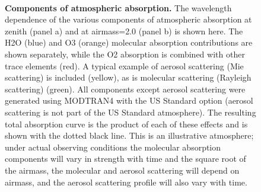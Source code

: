 \documentclass[12pt,preprint]{aastex}
\begin{document}
\begin{figure}
\centering
{}\\
\vspace{-15pt}
\caption{{\small
{\bf Components of atmospheric absorption.} The wavelength dependence
of the various components of atmospheric absorption at zenith (panel
a) and at airmass=2.0 (panel b) is shown here.  The H2O (blue) and O3
(orange) molecular absorption contributions are shown separately,
while the O2 absorption is combined with other trace elements (red). A
typical example of aerosol scattering (Mie scattering) is included
(yellow), as is molecular scattering (Rayleigh scattering)
(green). All components except aerosol scattering were generated using
MODTRAN4 with the US Standard option (aerosol scattering is not part of the US 
Standard atmosphere). The resulting total absorption curve is the product of each
of these effects and is shown with the dotted black line. This is an
illustrative atmosphere; under actual observing conditions the
molecular absorption components will vary in strength with time and
the square root of the airmass, the molecular and aerosol scattering
will depend on airmass, and the aerosol scattering profile will also 
vary with time.}}
\label{fig:absorption_comps}
\end{figure}
\end{document}
